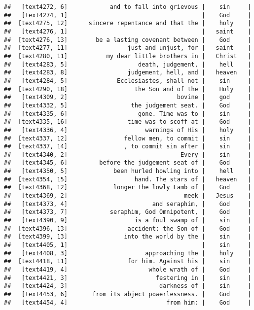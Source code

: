 \documentclass[]{article}
\begin{document}
\begin{verbatim}
##   [text4272, 6]            and to fall into grievous |    sin     |
##   [text4274, 1]                                      |    God     |
##  [text4275, 12]      sincere repentance and that the |    holy    |
##   [text4276, 1]                                      |   saint    |
##  [text4276, 13]        be a lasting covenant between |    God     |
##  [text4277, 11]                 just and unjust, for |   saint    |
##  [text4280, 11]           my dear little brothers in |   Christ   |
##   [text4283, 5]                    death, judgement, |    hell    |
##   [text4283, 8]                 judgement, hell, and |   heaven   |
##   [text4284, 5]              Ecclesiastes, shall not |    sin     |
##  [text4290, 18]                   the Son and of the |    Holy    |
##   [text4309, 2]                               bovine |    god     |
##   [text4332, 5]                  the judgement seat. |    God     |
##   [text4335, 6]                    gone. Time was to |    sin     |
##  [text4335, 16]                 time was to scoff at |    God     |
##   [text4336, 4]                      warnings of His |    holy    |
##  [text4337, 12]                fellow men, to commit |    sin     |
##  [text4337, 14]                , to commit sin after |    sin     |
##   [text4340, 2]                                Every |    sin     |
##   [text4345, 6]         before the judgement seat of |    God     |
##   [text4350, 5]             been hurled howling into |    hell    |
##  [text4354, 15]                   hand. The stars of |   heaven   |
##  [text4368, 12]             longer the lowly Lamb of |    God     |
##   [text4369, 2]                                 meek |   Jesus    |
##   [text4373, 4]                        and seraphim, |    God     |
##   [text4373, 7]            seraphim, God Omnipotent, |    God     |
##   [text4390, 9]                   is a foul swamp of |    sin     |
##  [text4396, 13]                 accident: the Son of |    God     |
##  [text4399, 13]                into the world by the |    sin     |
##   [text4405, 1]                                      |    sin     |
##   [text4408, 3]                      approaching the |    holy    |
##  [text4418, 11]                 for him. Against his |    sin     |
##   [text4419, 4]                       whole wrath of |    God     |
##   [text4421, 3]                         festering in |    sin     |
##   [text4424, 3]                          darkness of |    sin     |
##   [text4453, 6]       from its abject powerlessness. |    God     |
##   [text4454, 4]                            from him: |    God     |

\end{verbatim}
\end{document}

